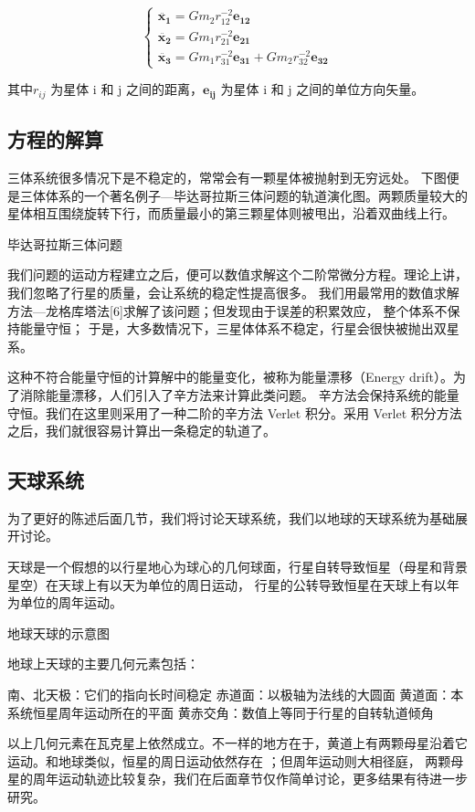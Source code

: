 \documentclass[a4paper,10.5pt]{article}
\begin{document}
$$
\begin{cases}
\ddot{\mathbf{x_1}} = Gm_2r_{12}^{-2} \mathbf{e_{12}}\\
\ddot{\mathbf{x_2}} = Gm_1r_{21}^{-2} \mathbf{e_{21}}\\
\ddot{\mathbf{x_3}} = Gm_1r_{31}^{-2} \mathbf{e_{31}} + Gm_2r_{32}^{-2} \mathbf{e_{32}}
\end{cases}
$$

其中$r_{ij}$ 为星体 i 和 j 之间的距离，$\mathbf{e_{ij}}$ 为星体 i 和 j 之间的单位方向矢量。

\subsection{方程的解算}

三体系统很多情况下是不稳定的，常常会有一颗星体被抛射到无穷远处。
下图便是三体体系的一个著名例子—毕达哥拉斯三体问题的轨道演化图。两颗质量较大的星体相互围绕旋转下行，而质量最小的第三颗星体则被甩出，沿着双曲线上行。

毕达哥拉斯三体问题

我们问题的运动方程建立之后，便可以数值求解这个二阶常微分方程。理论上讲，我们忽略了行星的质量，会让系统的稳定性提高很多。
我们用最常用的数值求解方法—龙格库塔法[6]求解了该问题；但发现由于误差的积累效应， 整个体系不保持能量守恒；
于是，大多数情况下，三星体体系不稳定，行星会很快被抛出双星系。

这种不符合能量守恒的计算解中的能量变化，被称为能量漂移（Energy drift）。为了消除能量漂移，人们引入了辛方法来计算此类问题。
辛方法会保持系统的能量守恒。我们在这里则采用了一种二阶的辛方法 Verlet 积分。采用 Verlet 积分方法之后，我们就很容易计算出一条稳定的轨道了。

\subsection{天球系统}

为了更好的陈述后面几节，我们将讨论天球系统，我们以地球的天球系统为基础展开讨论。

天球是一个假想的以行星地心为球心的几何球面，行星自转导致恒星（母星和背景星空）在天球上有以天为单位的周日运动，
行星的公转导致恒星在天球上有以年为单位的周年运动。

地球天球的示意图

地球上天球的主要几何元素包括：

南、北天极：它们的指向长时间稳定
赤道面：以极轴为法线的大圆面
黄道面：本系统恒星周年运动所在的平面
黄赤交角：数值上等同于行星的自转轨道倾角

以上几何元素在瓦克星上依然成立。不一样的地方在于，黄道上有两颗母星沿着它运动。和地球类似，恒星的周日运动依然存在 ；但周年运动则大相径庭，
两颗母星的周年运动轨迹比较复杂，我们在后面章节仅作简单讨论，更多结果有待进一步研究。
\end{document}
